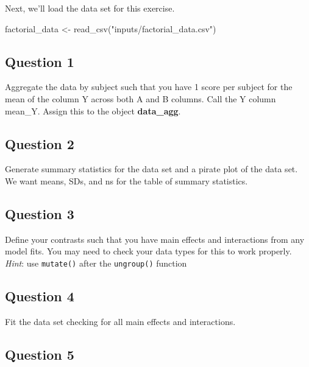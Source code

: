 \documentclass[
]{book}
\newenvironment{Shaded}{\begin{snugshade}}{\end{snugshade}}
\newcommand{\FunctionTok}[1]{\textcolor[rgb]{0.00,0.00,0.00}{#1}}
\newcommand{\NormalTok}[1]{#1}
\newcommand{\OtherTok}[1]{\textcolor[rgb]{0.56,0.35,0.01}{#1}}
\newcommand{\StringTok}[1]{\textcolor[rgb]{0.31,0.60,0.02}{#1}}
\begin{document}
Next, we'll load the data set for this exercise.

\begin{Shaded}
\begin{Highlighting}[]
\NormalTok{factorial\_data }\OtherTok{\textless{}{-}} \FunctionTok{read\_csv}\NormalTok{(}\StringTok{"inputs/factorial\_data.csv"}\NormalTok{)}
\end{Highlighting}
\end{Shaded}

\hypertarget{question-1-6}{%
\subsection{Question 1}\label{question-1-6}}

Aggregate the data by subject such that you have 1 score per subject for the mean of the column Y across both A and B columns. Call the Y column mean\_Y. Assign this to the object \textbf{data\_agg}.

\hypertarget{question-2-6}{%
\subsection{Question 2}\label{question-2-6}}

Generate summary statistics for the data set and a pirate plot of the data set. We want means, SDs, and ns for the table of summary statistics.

\hypertarget{question-3-6}{%
\subsection{Question 3}\label{question-3-6}}

Define your contrasts such that you have main effects and interactions from any model fits. You may need to check your data types for this to work properly.
\emph{Hint}: use \texttt{mutate()} after the \texttt{ungroup()} function

\hypertarget{question-4-6}{%
\subsection{Question 4}\label{question-4-6}}

Fit the data set checking for all main effects and interactions.

\hypertarget{question-5-6}{%
\subsection{Question 5}\label{question-5-6}}
\end{document}

